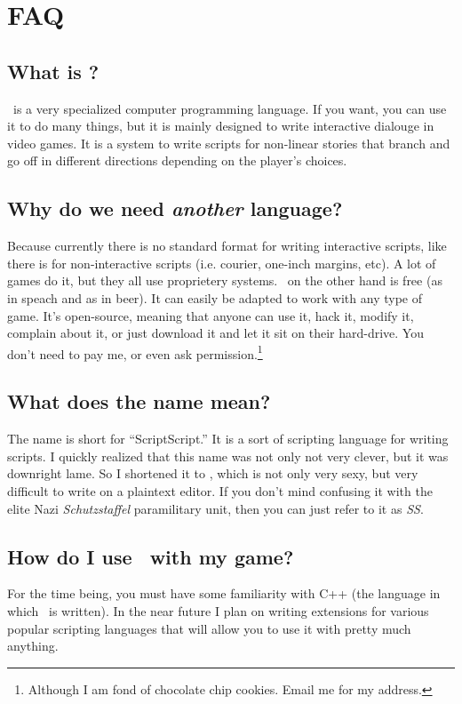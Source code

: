 \documentclass{book}
\begin{document}
%
%


\appendix

\chapter{FAQ}

\section{What is \SSquared?}
\SSquared\ is a very specialized computer programming language.  If you want, you can use it to do many things, but it is mainly designed to write interactive dialouge in video games.  It is a system to write scripts for non-linear stories that branch and go off in different directions depending on the player's choices.

\section{Why do we need \emph{another} language?}
Because currently there is no standard format for writing interactive scripts, like there is for non-interactive scripts (i.e. courier, one-inch margins, etc).  A lot of games do it, but they all use proprietery systems.  \SSquared\ on the other hand is free (as in speach and as in beer).  It can easily be adapted to work with any type of game.  It's open-source, meaning that anyone can use it, hack it, modify it, complain about it,  or just download it and let it sit on their hard-drive.  You don't need to pay me, or even ask permission.\footnote{Although I am fond of chocolate chip cookies.  Email me for my address.}

\section{What does the name mean?}
The name is short for ``ScriptScript.''  It is a sort of scripting language for writing scripts.  I quickly realized that this name was not only not very clever, but it was downright lame.  So I shortened it to \SSquared, which is not only very sexy, but very difficult to write on a plaintext editor.  If you don't mind confusing it with the elite Nazi \emph{Schutzstaffel} paramilitary unit, then you can just refer to it as \emph{SS}.

\section{How do I use \SSquared\ with my game?}
For the time being, you must have some familiarity with C++ (the language in which \SSquared\ is written).  In the near future I plan on writing extensions for various popular scripting languages that will allow you to use it with pretty much anything.  
\end{document}
